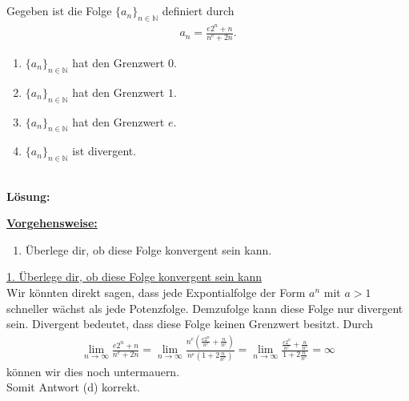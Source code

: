\subsection*{}
Gegeben ist die Folge $ \lbrace a_n \rbrace_{n \in \mathbb{N}}$
definiert durch
\begin{align*}
a_n = \frac{e  2^n + n}{n^e + 2n}.
\end{align*}
\renewcommand{\labelenumi}{(\alph{enumi})}
\begin{enumerate}
\item $ \lbrace a_n \rbrace_{n \in \mathbb{N}}$ hat den Grenzwert $0$.
\item $ \lbrace a_n \rbrace_{n \in \mathbb{N}}$ hat den Grenzwert $1$.
\item $ \lbrace a_n \rbrace_{n \in \mathbb{N}}$ hat den Grenzwert $e$.
\item $ \lbrace a_n \rbrace_{n \in \mathbb{N}}$ ist divergent.
\end{enumerate}
\ \\
\textbf{Lösung:}
\begin{mdframed}
\underline{\textbf{Vorgehensweise:}}
\renewcommand{\labelenumi}{\theenumi.}
\begin{enumerate}
\item Überlege dir, ob diese Folge konvergent sein kann.
\end{enumerate}
\end{mdframed}

\underline{1. Überlege dir, ob diese Folge konvergent sein kann}\\
Wir könnten direkt sagen, dass jede Expontialfolge der Form
$a^n$ mit $a > 1$ schneller wächst als jede Potenzfolge.
Demzufolge kann diese Folge nur divergent sein.
Divergent bedeutet, dass diese Folge keinen Grenzwert besitzt.
Durch
\begin{align*}
\lim \limits_{n \rightarrow \infty}
\frac{e  2^n + n}{n^e + 2n}
=
\lim \limits_{n \rightarrow \infty}
\frac{n^e(\frac{e  2^n}{n^e}  + \frac{n}{n^e})}{n^e (1 + 2\frac{n}{n^e})}
=
\lim \limits_{n \rightarrow \infty}
\frac{\frac{e  2^n}{n^e}  + \frac{n}{n^e}}{1 + 2\frac{n}{n^e}}
=
\infty
\end{align*}
können wir dies noch untermauern.\\
Somit Antwort (d) korrekt.
\newpage

